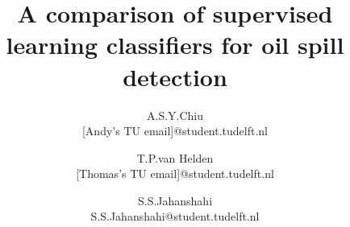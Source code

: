 \documentclass{article}
\title{\vspace{-15mm}\fontsize{18pt}{10pt}\selectfont\textbf{A comparison of supervised learning classifiers for oil spill detection}} %
\author{
A.S.Y.Chiu \\ \scriptsize{[Andy's TU email]@student.tudelft.nl}  \and
     \and T.P.van Helden \\ \scriptsize{[Thomas's TU email]@student.tudelft.nl}
   \and S.S.Jahanshahi\\ \scriptsize{S.S.Jahanshahi@student.tudelft.nl}
}
\date{}
\begin{document}
\maketitle %

\thispagestyle{fancy} %


\begin{abstract}

  


\end{abstract}

\end{document}
